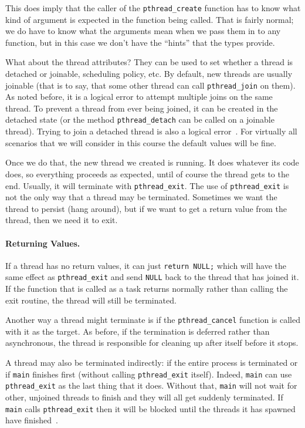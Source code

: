 \documentclass[a4paper]{report}
\begin{document}
This does imply that the caller of the \texttt{pthread\_create} function has to know what kind of argument is expected in the function being called. That is fairly normal; we do have to know what the arguments mean when we pass them in to any function, but in this case we don't have the ``hints'' that the types provide.

What about the thread attributes? They can be used to set whether a thread is detached or joinable, scheduling policy, etc. By default, new threads are usually joinable (that is to say, that some other thread can call \texttt{pthread\_join} on them). As noted before, it is a logical error to attempt multiple joins on the same thread. To prevent a thread from ever being joined, it can be created in the detached state (or the method \texttt{pthread\_detach} can be called on a joinable thread). Trying to join a detached thread is also a logical error~\cite{pthreads}. For virtually all scenarios that we will consider in this course the default values will be fine.

Once we do that, the new thread we created is running. It does whatever its code does, so everything proceeds as expected, until of course the thread gets to the end. Usually, it will terminate with \texttt{pthread\_exit}. The use of \texttt{pthread\_exit} is not the only way that a thread may be terminated. Sometimes we want the thread to persist (hang around), but if we want to get a return value from the thread, then we need it to exit.

\paragraph{Returning Values.} If a thread has no return values, it can just \texttt{return NULL;} which will have the same effect as \texttt{pthread\_exit} and send \texttt{NULL} back to the thread that has joined it. If the function that is called as a task returns normally rather than calling the exit routine, the thread will still be terminated.

Another way a thread might terminate is if the \texttt{pthread\_cancel} function is called with it as the target. As before, if the termination is deferred rather than asynchronous, the thread is responsible for cleaning up after itself before it stops.

A thread may also be terminated indirectly: if the entire process is terminated or if \texttt{main} finishes first (without calling \texttt{pthread\_exit} itself). Indeed, \texttt{main} can use \texttt{pthread\_exit} as the last thing that it does. Without that, \texttt{main} will not wait for other, unjoined threads to finish and they will all get suddenly terminated. If \texttt{main} calls \texttt{pthread\_exit} then it will be blocked until the threads it has spawned have finished~\cite{pthreads}.
\end{document}

